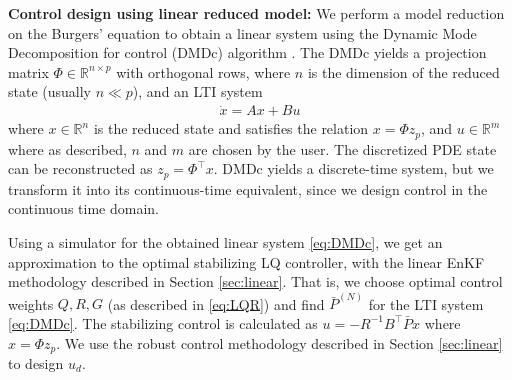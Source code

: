 \documentclass[letterpaper, 10 pt, conference]{ieeeconf}  %
\newcommand{\tp}{^\top}
\newcommand{\inv}{^{-1}}
\newcommand{\R}{\mathbb{R}}
\begin{document}
\noindent \textbf{Control design using linear reduced model:} 
We perform a model reduction on the Burgers' equation to obtain a linear system using the Dynamic Mode Decomposition for control (DMDc) algorithm \cite{zhang-2024}. The DMDc yields a projection matrix $\Phi \in \R^{n \times p}$ with orthogonal rows, where $n$ is the dimension of the reduced state (usually $n \ll p$), and an LTI system  
\begin{align}
\dot{x} = Ax + Bu
\label{eq:DMDc}
\end{align}
where $x \in \R^n$ is the reduced state and satisfies the relation $x = \Phi z_p$, and $u \in \R^m$ where as described, $n$ and $m$ are chosen by the user. The discretized PDE state can be reconstructed as $z_p = \Phi\tp x$. DMDc yields a discrete-time system, but we transform it into its continuous-time equivalent, since we design control in the continuous time domain. 

Using a simulator for the obtained linear system \eqref{eq:DMDc}, we get an approximation to the optimal stabilizing LQ controller, with the linear EnKF methodology described in Section \ref{sec:linear}. 
That is, we choose optimal control weights $Q,R,G$ (as described in \eqref{eq:LQR}) and find $\bar{P}^{(N)}$ for the LTI system \eqref{eq:DMDc}. The stabilizing control is calculated as $u = -R\inv B\tp \bar{P} x$ where $x = \Phi z_p$. We use the robust control methodology described in Section \ref{sec:linear} to design $u_d$. 



\end{document}
